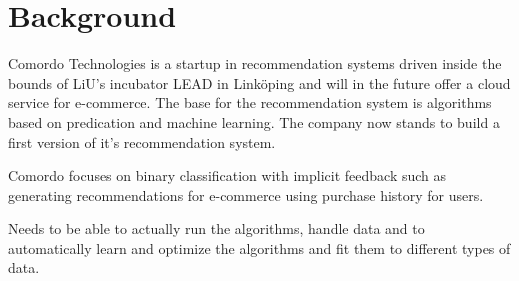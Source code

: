 
\chapter{Background}\label{cha:background}

Comordo Technologies is a startup in recommendation systems driven inside the bounds of LiU's incubator LEAD in Linköping and will in the future offer a cloud service for e-commerce. The base for the recommendation system is algorithms based on predication and machine learning. The company now stands to build a first version of it's recommendation system.

Comordo focuses on binary classification with implicit feedback such as generating recommendations for e-commerce using purchase history for users.


Needs to be able to actually run the algorithms, handle data and to automatically learn and optimize the algorithms and fit them to different types of data.



\newpage






